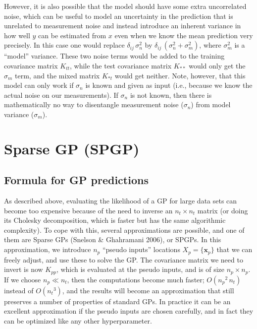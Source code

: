 \documentclass[11pt,a4paper]{article}
\numberwithin{equation}{section}
\begin{document}
However, it is also possible that the model should have some extra uncorrelated noise, which can be useful to model an uncertainty in the prediction that is unrelated to measurement noise and instead introduce an inherent variance in how well $y$ can be estimated from $x$ even when we know the mean prediction very precisely. In this case one would replace $\delta_{ij}\,\sigma_n^2$ by $\delta_{ij}\,(\sigma_n^2 + \sigma_m^2)$, where $\sigma_m^2$ is a ``model'' variance. These two noise terms would be added to the training covariance matrix $K_{tt}$, while the test covariance matrix $K_{**}$ would only get the $\sigma_m$ term, and the mixed matrix $K_{*t}$ would get neither. Note, however, that this model can only work if $\sigma_n$ is known and given as input (i.e., because we know the actual noise on our measurements). If $\sigma_n$ is not known, then there is mathematically no way to disentangle measurement noise ($\sigma_n$) from model variance ($\sigma_m$).

\section{Sparse GP (SPGP)}

\subsection{Formula for GP predictions}

As described above, evaluating the likelihood of a GP for large data sets can become too expensive because of the need to inverse an $n_t \times n_t$ matrix (or doing its Cholesky decomposition, which is faster but has the same algorithmic complexity). To cope with this, several approximations are possible, and one of them are Sparse GPs (Snelson \& Ghahramani 2006), or SPGPs. In this approximation, we introduce $n_p$ ``pseudo inputs'' locations $X_p = \{\mathbf{x}_p\}$ that we can freely adjust, and use these to solve the GP. The covariance matrix we need to invert is now $K_{pp}$, which is evaluated at the pseudo inputs, and is of size $n_p \times n_p$. If we choose $n_p \ll n_t$, then the computations become much faster; $O({n_p}^2\,n_t)$ instead of $O({n_t}^3)$, and the results will become an approximation that still preserves a number of properties of standard GPs. In practice it can be an excellent approximation if the pseudo inputs are chosen carefully, and in fact they can be optimized like any other hyperparameter.
\end{document}
